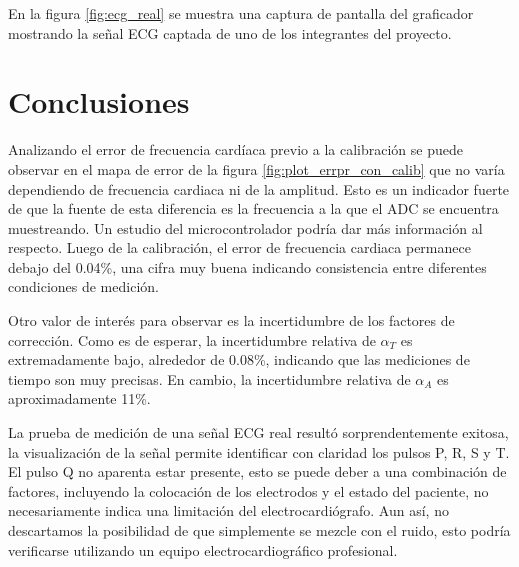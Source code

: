 \documentclass[conference]{IEEEtran}
\begin{document}
En la figura \ref{fig:ecg_real} se muestra una captura de pantalla del graficador
mostrando la señal ECG captada de uno de los integrantes del proyecto.








\section{Conclusiones}

Analizando el error de frecuencia cardíaca previo a la calibración se puede observar
en el mapa de error de la figura \ref{fig:plot_errpr_con_calib} que no varía
dependiendo de frecuencia cardiaca ni de la amplitud.
Esto es un indicador fuerte de que la fuente de esta diferencia es la frecuencia a
la que el ADC se encuentra muestreando. Un estudio del microcontrolador
podría dar más información al respecto. Luego de la calibración, el error de
frecuencia cardiaca permanece debajo del 0.04\%, una cifra muy buena indicando
consistencia entre diferentes condiciones de medición.



Otro valor de interés para observar es la incertidumbre de los factores de corrección.
Como es de esperar, la incertidumbre relativa de $\alpha_T$ es extremadamente bajo,
alrededor de 0.08\%, indicando que las mediciones de tiempo son muy precisas.
En cambio, la incertidumbre relativa de $\alpha_A$ es aproximadamente 11\%.

La prueba de medición de una señal ECG real resultó sorprendentemente exitosa,
la visualización de la señal permite identificar con claridad los pulsos P, R, S y T.
El pulso Q no aparenta estar presente, esto se puede deber a una combinación de
factores, incluyendo la colocación de los electrodos y el estado del paciente,
no necesariamente indica una limitación del electrocardiógrafo. Aun así, no
descartamos la posibilidad de que simplemente se mezcle con el ruido, esto podría
verificarse utilizando un equipo electrocardiográfico profesional.




\newpage

\end{document}
